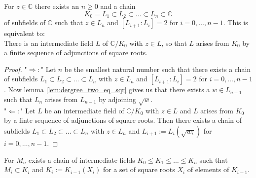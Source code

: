 \begin{lemma}
    \label{lem:Z_in_Minf_imp_eq} 
    \leanok
    For $z \in \mathbb{C}$
    there exists an $n\ge 0$ and a chain 
    $$K_0 = L_1 \subset L_2 \subset \ldots \subset L_n \subset \mathbb{C}$$
    of subfields of $\mathbb{C}$ such that $z \in L_n$ and 
    $ [L_{i+1}:L_i] = 2 $ for $i = 0, \ldots, n-1$. This is equivalent to:\\
    There is an intermediate field $L$ of $\mathbb{C}/K_0$ with $z \in L$, so that $L$ arises from $K_0$ by a finite sequence of adjunctions of square roots.
\end{lemma}
\begin{proof}
    "$\Rightarrow:$" Let $n$ be the smallest natural number such that there exists a chain of subfields $L_1 \subset L_2 \subset \ldots \subset L_n$ with $z \in L_n$ and $[L_{i+1}:L_i] = 2$ for $i = 0, \ldots, n-1$. Now lemma \ref{lem:dergree_two_eq_sqr} gives us that there exists a $w \in L_{n-1}$ such that $L_n$ arises from $L_{n-1}$ by adjoining $\sqrt{w}$.\\
    "$\Leftarrow:$" Let $L$ be an intermediate field of $\mathbb{C}/K_0$ with $z \in L$ and $L$ arises from $K_0$ by a finte sequence of adjunctions of square roots. Then there exists a chain of subfields $L_1 \subset L_2 \subset \ldots \subset L_n$ with $z \in L_n$ and $L_{i+1}:= L_i(\sqrt{w_i})$ for $i = 0, \ldots, n-1$.
\end{proof}

\begin{lemma}
    \label{lem:Mi_chain}
    \leanok
    For $M_n$ exists a chain of intermediate fields $K_0 \le K_1 \le \ldots \le K_n$ such that $M_i\subset K_i$ and $K_i:= K_{i-1}(X_i)$ for a set of square roots $X_i$ of elements of $K_{i-1}$.
\end{lemma}

